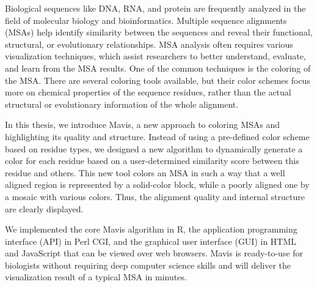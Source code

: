 Biological sequences like DNA, RNA, and protein are frequently analyzed in the field of molecular biology and bioinformatics. Multiple sequence alignments (MSAs) help identify similarity between the sequences and reveal their functional, structural, or evolutionary relationships. MSA analysis often requires various visualization techniques, which assist researchers to better understand, evaluate, and learn from the MSA results. One of the common techniques is the coloring of the MSA. There are several coloring tools available, but their color schemes focus more on chemical properties of the sequence residues, rather than the actual structural or evolutionary information of the whole alignment.

In this thesis, we introduce Mavis, a new approach to coloring MSAs and highlighting its quality and structure. Instead of using a pre-defined color scheme based on residue types, we designed a new algorithm to dynamically generate a color for each residue based on a user-determined similarity score between this residue and others. This new tool colors an MSA in such a way that a well aligned region is represented by a solid-color block, while a poorly aligned one by a mosaic with various colors. Thus, the alignment quality and internal structure are clearly displayed.

We implemented the core Mavis algorithm in R, the application programming interface (API) in Perl CGI, and the graphical user interface (GUI) in HTML and JavaScript that can be viewed over web browsers. Mavis is ready-to-use for biologists without requiring deep computer science skills and will deliver the visualization result of a typical MSA in minutes.
